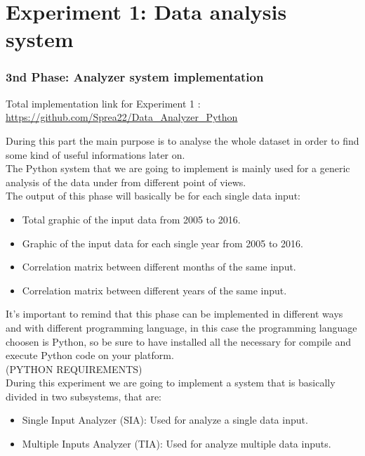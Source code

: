 \part{Experiment 1: Data analysis system}
\section{3nd Phase: Analyzer system implementation}
Total implementation link for Experiment 1 : \\
\url{https://github.com/Sprea22/Data_Analyzer_Python}

During this part the main purpose is to analyse the whole dataset in order to find some kind of useful informations later on. \\
The Python system that we are going to implement is mainly used for a generic analysis of the data under from different point of views.\\
The output of this phase will basically be for each single data input:
\begin{itemize}
\item Total graphic of the input data from 2005 to 2016.
\item Graphic of the input data for each single year from 2005 to 2016.
\item Correlation matrix between different months of the same input.
\item Correlation matrix between different years of the same input.
\end{itemize}


It's important to remind that this phase can be implemented in different ways and with different programming language, in this case the programming language choosen is Python, so be sure to have installed all the necessary for compile and execute Python code on your platform.\\
(PYTHON REQUIREMENTS)\\
During this experiment we are going to implement a system that is basically divided in two subsystems, that are:
\begin{itemize}
\item Single Input Analyzer (SIA): Used for analyze a single data input.
\item Multiple Inputs Analyzer (TIA): Used for analyze multiple data inputs.
\end{itemize}
\newpage


\newpage
